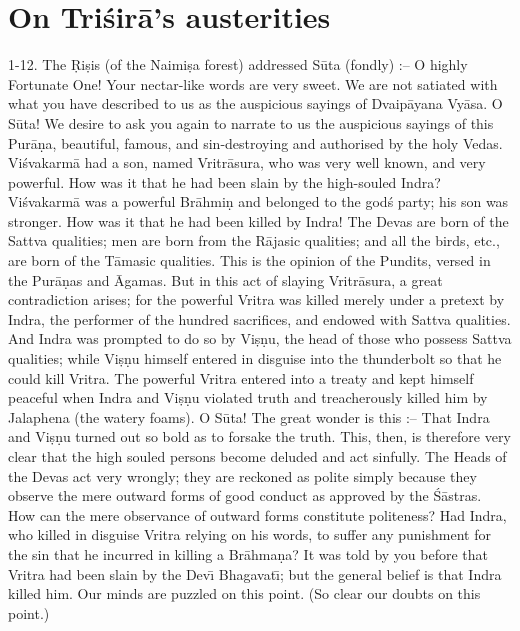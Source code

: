 \chapter{On Tri\'sir\=a's austerities}

1-12. The \d{R}i\d{s}is (of the Naimi\d{s}a forest) addressed S\=uta (fondly) :-- O highly Fortunate One! Your nectar-like words are very sweet. We are not satiated with what you have described to us as the auspicious sayings of Dvaip\=ayana Vy\=asa. O S\=uta! We desire to ask you again to narrate to us the auspicious sayings of this Pur\=a\d{n}a, beautiful, famous, and sin-destroying and authorised by the holy Vedas. Vi\'svakarm\=a had a son, named Vritr\=asura, who was very well known, and very powerful. How was it that he had been slain by the high-souled Indra? Vi\'svakarm\=a was a powerful Br\=ahmi\d{n} and belonged to the god\'s party; his son was stronger. How was it that he had been killed by Indra! The Devas are born of the Sattva qualities; men are born from the R\=ajasic qualities; and all the birds, etc., are born of the T\=amasic qualities. This is the opinion of the Pundits, versed in the Pur\=a\d{n}as and \=Agamas. But in this act of slaying Vritr\=asura, a great contradiction arises; for the powerful Vritra was killed merely under a pretext by Indra, the performer of the hundred sacrifices, and endowed with Sattva qualities. And Indra was prompted to do so by Vi\d{s}\d{n}u, the head of those who possess Sattva qualities; while Vi\d{s}\d{n}u himself entered in disguise into the thunderbolt so that he could kill Vritra. The powerful Vritra entered into a treaty and kept himself peaceful when Indra and Vi\d{s}\d{n}u violated truth and treacherously killed him by Jalaphena (the watery foams). O S\=uta! The great wonder is this :-- That Indra and Vi\d{s}\d{n}u turned out so bold as to forsake the truth. This, then, is therefore very clear that the high souled persons become deluded and act sinfully. The Heads of the Devas act very wrongly; they are reckoned as polite simply because they observe the mere outward forms of good conduct as approved by the \'S\=astras. How can the mere observance of outward forms constitute politeness? Had Indra, who killed in disguise Vritra relying on his words, to suffer any punishment for the sin that he incurred in killing a Br\=ahma\d{n}a? It was told by you before that Vritra had been slain by the Dev\={\i} Bhagavat\={\i}; but the general belief is that Indra killed him. Our minds are puzzled on this point. (So clear our doubts on this point.)

